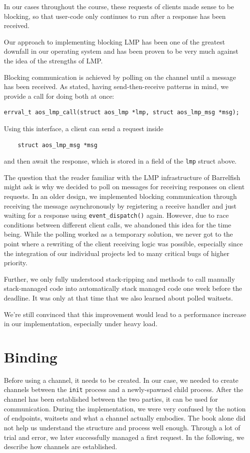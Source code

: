 In our cases throughout the course, these requests of clients made sense to be blocking, 
so that user-code only continues to run after a response has been received.

Our approach to implementing blocking LMP has been one of the greatest downfall in
our operating system and has been proven to be very much against the idea of the strengths of LMP.

Blocking communication is achieved by polling on the channel until a message has been received.
As stated, having send-then-receive patterns in mind, we provide a call for doing 
both at once:

\begin{verbatim}
errval_t aos_lmp_call(struct aos_lmp *lmp, struct aos_lmp_msg *msg);
\end{verbatim}

Using this interface, a client can send a request inside
\begin{verbatim}
    struct aos_lmp_msg *msg
\end{verbatim}
and then await the response, which is stored in a field of the \texttt{lmp} struct above.

The question that the reader familiar with the LMP infrastructure of Barrelfish might ask is
why we decided to poll on messages for receiving responses on client requests.
In an older design, we implemented blocking communication through receiving the message asynchronously 
by registering a receive handler and just waiting for a response using \texttt{event\_dispatch()} again.
However, due to race conditions between different client calls, we abandoned this idea for the time being. 
While the polling worked as a temporary solution, we never got to the point where a rewriting of the client receiving
logic was possible, especially since the integration of our individual projects led to many critical bugs of higher priority.

Further, we only fully understood stack-ripping and methods to call manually stack-managed code
into automatically stack managed code one week before the deadline. It was only at that time that
we also learned about polled waitsets.

We're still convinced that this improvement would lead to a performance increase in 
our implementation, especially under heavy load.

\section{Binding}
Before using a channel, it needs to be created. 
In our case, we needed to create channels between the \texttt{init} process and a newly-spawned
child process. After the channel has been established between the two parties, 
it can be used for communication. During the implementation, we were very confused by the notion of
endpoints, waitsets and what a channel actually embodies. The book alone did not help
us understand the structure and process well enough. Through a lot of trial and error,
we later successfully managed a first request.
In the following, we describe how channels are established.


